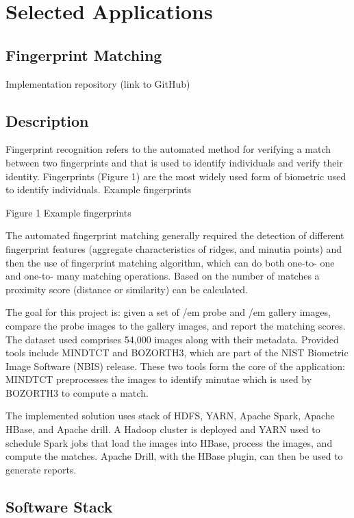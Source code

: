 \documentclass[9pt,twocolumn,twoside]{styles/osajnl}
\begin{document}
\section{Selected Applications}

\subsection{Fingerprint Matching}

Implementation repository (link to GitHub)

\subsection{Description}

Fingerprint recognition refers to the automated method for verifying a match between two fingerprints and that is used to identify individuals and verify their identity. Fingerprints (Figure 1) are the most widely used form of biometric used to identify individuals.
 Example fingerprints 

Figure 1 Example fingerprints


The automated fingerprint matching generally required the detection of different fingerprint features (aggregate characteristics of ridges, and minutia points) and then the use of fingerprint matching algorithm, which can do both one-to- one and one-to- many matching operations. Based on the number of matches a proximity score (distance or similarity) can be calculated.


The goal for this project is: given a set of {/em probe} and {/em gallery}
images, compare the probe images to the gallery images, and report the
matching scores.  The dataset used comprises 54,000 images along with
their metadata. Provided tools include MINDTCT and BOZORTH3, which are
part of the NIST Biometric Image Software (NBIS) release. These two
tools form the core of the application: MINDTCT preprocesses the
images to identify minutae which is used by BOZORTH3 to compute a
match.



The implemented solution uses stack of HDFS, YARN, Apache Spark, Apache HBase, and Apache drill. A Hadoop cluster is deployed and YARN used to schedule Spark jobs that load the images into HBase, process the images, and compute the matches. Apache Drill, with the HBase plugin, can then be used to generate reports.

\subsection{Software Stack}
\end{document}
